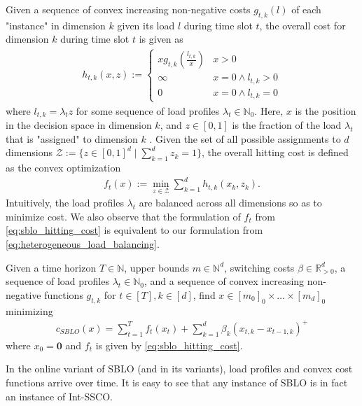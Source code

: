 Given a sequence of convex increasing non-negative costs $g_{t,k}(l)$ of each "instance" in dimension $k$ given its load $l$ during time slot $t$, the overall cost for dimension $k$ during time slot $t$ is given as \begin{align*}
    h_{t,k}(x,z) := \begin{cases}
        x g_{t,k}\left(\frac{l_{t,k}}{x}\right) & x > 0 \\
        \infty                                  & x = 0 \land l_{t,k} > 0 \\
        0                                       & x = 0 \land l_{t,k} = 0
    \end{cases}
\end{align*} where $l_{t,k} = \lambda_t z$ for some sequence of load profiles $\lambda_t \in \mathbb{N}_0$. Here, $x$ is the position in the decision space in dimension $k$, and $z \in [0,1]$ is the fraction of the load $\lambda_t$ that is "assigned" to dimension $k$ \cite{Albers2021_2}. Given the set of all possible assignments to $d$ dimensions $\mathcal{Z} := \{z \in [0,1]^d \mid \sum_{k=1}^d z_k = 1\}$, the overall hitting cost is defined as the convex optimization \begin{align}
\label{eq:sblo_hitting_cost}
    f_t(x) := \min_{z \in \mathcal{Z}} \sum_{k=1}^d h_{t,k}(x_k,z_k).
\end{align} Intuitively, the load profiles $\lambda_t$ are balanced across all dimensions so as to minimize cost. We also observe that the formulation of $f_t$ from \autoref{eq:sblo_hitting_cost} is equivalent to our formulation from \autoref{eq:heterogeneous_load_balancing}.

\begin{problem}\label{problem:sblo}
Given a time horizon $T \in \mathbb{N}$, upper bounds $m \in \mathbb{N}^d$, switching costs $\beta \in \mathbb{R}_{>0}^d$, a sequence of load profiles $\lambda_t \in \mathbb{N}_0$, and a sequence of convex increasing non-negative functions $g_{t,k}$ for $t \in [T], k \in [d]$, find $x \in [m_0]_0 \times \dots \times [m_d]_0$ minimizing \begin{align*}
    c_{SBLO}(x) = \sum_{t=1}^T f_t(x_t) + \sum_{k=1}^d \beta_k (x_{t,k} - x_{t-1,k})^+
\end{align*}
where $x_0 = \mathbf{0}$ and $f_t$ is given by \autoref{eq:sblo_hitting_cost}.
\end{problem}

In the online variant of SBLO (and in its variants), load profiles and convex cost functions arrive over time. It is easy to see that any instance of SBLO is in fact an instance of Int-SSCO.

